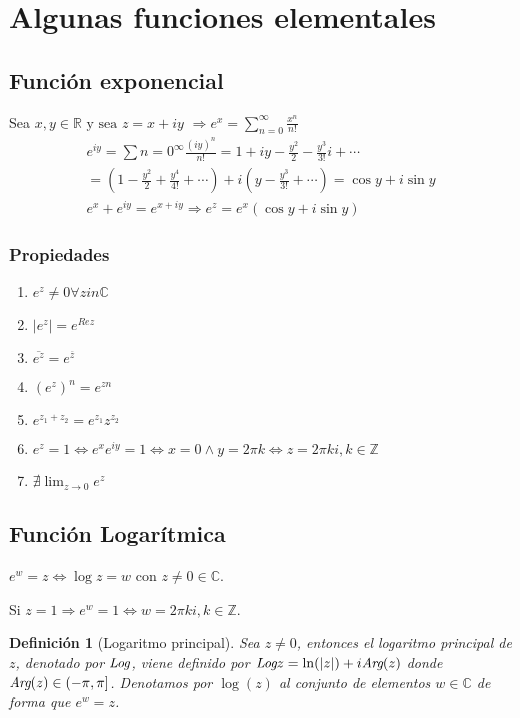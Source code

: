 \documentclass[10pt]{book}
\newtheorem{defi}{Definición}[chapter]
\newcommand{\R}{\mathbb{R}}
\newcommand{\C}{\mathbb{C}}
\newcommand{\Z}{\mathbb{Z}}
\newcommand{\Log}{\emph{Log}}
\newcommand{\Arg}{\emph{Arg}}
\begin{document}
\section{Algunas funciones elementales}
\subsection{Función exponencial}
Sea $x,y \in\R \text{ y sea } z = x+iy$
$\Rightarrow e^{x} = \sum_{n=0}^\infty \frac{x^n}{n!}$
\begin{multline*}
e^{iy} = \sum{n=0}^\infty \frac{(iy)^n}{n!} = 1 + iy - \frac{y^2}{2}-\frac{y^3}{3!}i + \cdots\\
= (1-\frac{y^2}{2} + \frac{y^4}{4!}+\cdots) +i(y-\frac{y^3}{3!}+\cdots) = \cos y + i \sin y\\
e^x + e^{iy} = e^{x+iy} \Rightarrow e^{z} = e^x(\cos y + i \sin y)
\end{multline*}
\subsubsection*{Propiedades}
\begin{enumerate}
\item $e^z \neq 0 \forall z in \C$
\item $|e^{z}| = e^{Re z}$
\item $\overline{e^z} = e^{\overline z}$
\item $(e^z)^n = e^{zn}$
\item $e^{z_1+z_2} = e^{z_1}z^{z_2}$
\item $ e^z = 1 \Leftrightarrow e^x e^{iy}=1 \Leftrightarrow x = 0 \wedge y = 2\pi k \Leftrightarrow z = 2\pi ki, k\in \Z$
\item $\displaystyle \nexists \lim_{z \to 0} e^z$
\end{enumerate}

\subsection{Función Logarítmica}
$e^w = z \Leftrightarrow \log z = w$ con $z \neq 0 \in \C$.

Si $z=1 \Rightarrow e^w = 1 \Leftrightarrow w = 2\pi k i, k \in \Z$.
 
\begin{defi}[Logaritmo principal]
Sea $z\neq 0$, entonces el logaritmo principal de $z$, denotado por $\Log$, viene definido por $\Log z = \ln(|z|) + i \Arg(z)$ donde $\Arg(z)\in (-\pi,\pi]$. Denotamos por $\log(z)$ al conjunto de elementos $w \in \C$ de forma que $e^w = z$. 
\end{defi}
\end{document}
